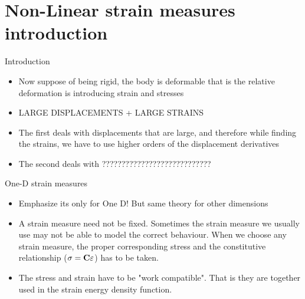 \section{Non-Linear strain measures introduction}
	\begin{frame}{Introduction}
		\begin{itemize}
			\item Now suppose of being rigid, the body is deformable that is the relative deformation is introducing strain and stresses
			\item LARGE DISPLACEMENTS + LARGE STRAINS
			\item The first deals with displacements that are large, and therefore while finding the strains, we have to use higher orders of the displacement derivatives
			\item The second deals with ????????????????????????????		
		\end{itemize}
	\end{frame}

	\begin{frame}{One-D strain measures}
		\begin{itemize}
			\item Emphasize its only for One D! But same theory for other dimensions
			\item A strain measure need not be fixed. Sometimes the strain measure we usually use may not be able to model the correct behaviour. When we choose any strain measure, the proper corresponding stress and the  constitutive relationship ($\mathbf{\sigma = C \varepsilon}$) has to be taken. 
			\item The stress and strain have to be "work compatible". That is they are together used in the strain energy density function. 			
		\end{itemize}
	\end{frame}

